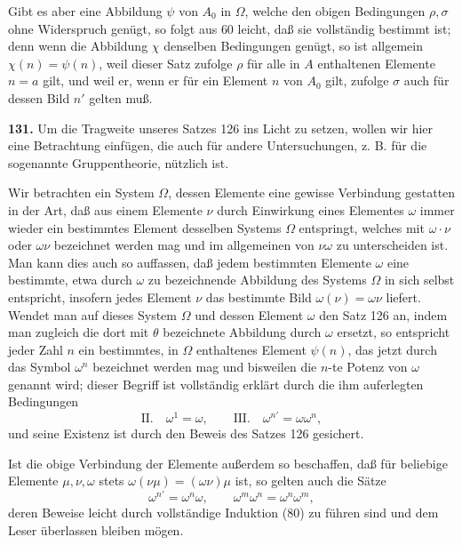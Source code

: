 \documentclass[11pt]{article}
\begin{document}
Gibt es aber eine Abbildung $\psi$ von $A_0$ in $\Omega$, welche den obigen Bedingungen $\rho,\sigma$ ohne Widerspruch genügt, so folgt aus 60 leicht, daß sie vollständig bestimmt ist; denn wenn die Abbildung $\chi$ denselben Bedingungen genügt, so ist allgemein $\chi(n)=\psi(n)$, weil dieser Satz zufolge $\rho$ für alle in $A$ enthaltenen Elemente $n=a$ gilt, und weil er, wenn er für ein Element $n$ von $A_0$ gilt, zufolge $\sigma$ auch für dessen Bild $n'$ gelten muß.

\noindent\textbf{131.} Um die Tragweite unseres Satzes 126 ins Licht zu setzen, wollen wir hier eine Betrachtung einfügen, die auch für andere Untersuchungen, z. B. für die sogenannte Gruppentheorie, nützlich ist.

Wir betrachten ein System $\Omega$, dessen Elemente eine gewisse Verbindung gestatten in der Art, daß aus einem Elemente $\nu$ durch Einwirkung eines Elementes $\omega$ immer wieder ein bestimmtes Element desselben Systems $\Omega$ entspringt, welches mit $\omega\cdot\nu$ oder $\omega\nu$ bezeichnet werden mag und im allgemeinen von $\nu\omega$ zu unterscheiden ist. Man kann dies auch so auffassen, daß jedem bestimmten Elemente $\omega$ eine bestimmte, etwa durch $\omega$ zu bezeichnende Abbildung des Systems $\Omega$ in sich selbst entspricht, insofern jedes Element $\nu$ das bestimmte Bild $\omega(\nu)=\omega\nu$ liefert. Wendet man auf dieses System $\Omega$ und dessen Element $\omega$ den Satz 126 an, indem man zugleich die dort mit $\theta$ bezeichnete Abbildung durch $\omega$ ersetzt, so entspricht jeder Zahl $n$ ein bestimmtes, in $\Omega$ enthaltenes Element $\psi(n)$, das jetzt durch das Symbol $\omega^n$ bezeichnet werden mag und bisweilen die $n$-te Potenz von $\omega$ genannt wird; dieser Begriff ist vollständig erklärt durch die ihm auferlegten Bedingungen
\[
\text{II.}\quad \omega^1=\omega,
\qquad
\text{III.}\quad \omega^{n'}=\omega\omega^n,
\]
und seine Existenz ist durch den Beweis des Satzes 126 gesichert.

Ist die obige Verbindung der Elemente außerdem so beschaffen, daß für beliebige Elemente $\mu,\nu,\omega$ stets $\omega(\nu\mu)=(\omega\nu)\mu$ ist, so gelten auch die Sätze
\[
\omega^{n'}=\omega^n\omega,
\qquad
\omega^m\omega^n=\omega^n\omega^m,
\]
deren Beweise leicht durch vollständige Induktion (80) zu führen sind und dem Leser überlassen bleiben mögen.
\end{document}
